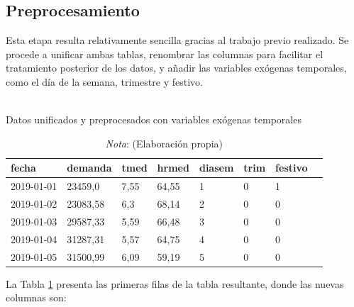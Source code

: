 \documentclass[12pt,a4paper]{report}
\begin{document}
\subsection{Preprocesamiento}

Esta etapa resulta relativamente sencilla gracias al trabajo previo realizado. Se procede a unificar ambas tablas, renombrar las columnas para facilitar el tratamiento posterior de los datos, y añadir las variables exógenas temporales, como el día de la semana, trimestre y festivo.

\begin{table}[H]
\centering
\caption{\\ Datos unificados y preprocesados con variables exógenas temporales} 
\renewcommand{\arraystretch}{1.2} %
\begin{tabular}{llllllll}
\toprule
\textbf{fecha}       & \textbf{demanda} & \textbf{tmed} & \textbf{hrmed} & \textbf{diasem} & \textbf{trim} & \textbf{festivo} \\ \midrule
2019-01-01           & 23459,0               & 7,55          & 64,55            & 1               & 0             & 1           \\ \hline
2019-01-02           & 23083,58              & 6,3           & 68,14            & 2               & 0             & 0           \\ \hline
2019-01-03           & 29587,33              & 5,59          & 66,48            & 3               & 0             & 0           \\ \hline
2019-01-04           & 31287,31              & 5,57          & 64,75            & 4               & 0             & 0           \\ \hline
2019-01-05           & 31500,99              & 6,09          & 59,19            & 5               & 0             & 0           \\ 
\bottomrule
\end{tabular}
\renewcommand{\arraystretch}{1.2}
\label{tbl:datos_unificados}
\caption*{\textit{Nota}: (Elaboración propia)}
\end{table}


La Tabla \ref{tbl:datos_unificados} presenta las primeras filas de la tabla resultante, donde las nuevas columnas son:
\end{document}
